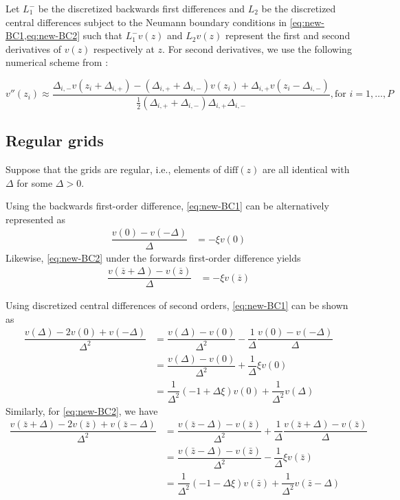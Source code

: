 \documentclass[11pt]{article}
\begin{document}
Let $L_1^{-}$ be the discretized backwards first differences and $L_2$ be the discretized central differences subject to the Neumann boundary conditions in \cref{eq:new-BC1,eq:new-BC2} such that $L_1^{-} v(z)$ and $L_2 v(z)$ represent the first and second derivatives of $v(z)$ respectively at $z$. For second derivatives, we use the following numerical scheme from \cite{achdou17}:

\begin{equation}
v''(z_i) \approx \dfrac{ \Delta_{i,-} v( z_i + \Delta_{i,+}) - (\Delta_{i,+} + \Delta_{i,-}) v( z_i ) + \Delta_{i,+} v( z_i - \Delta_{i,-})}{\frac{1}{2}(\Delta_{i,+} + \Delta_{i,-}) \Delta_{i,+} \Delta_{i,-} }, \text{for } i = 1, \ldots, P
\end{equation}





\subsection{Regular grids}
Suppose that the grids are regular, i.e., elements of $\text{diff}(z)$ are all identical with $\Delta$ for some $\Delta > 0$.

Using the backwards first-order difference, \eqref{eq:new-BC1} can be alternatively represented as
\begin{align}
\dfrac{v(0) - v(-\Delta)}{\Delta} &= - \xi v(0)
\end{align}
Likewise, \eqref{eq:new-BC2} under the forwards first-order difference yields
\begin{align}
\dfrac{v(\overline{z} + \Delta) - v(\overline{z})}{\Delta} &= - \xi v(\overline{z})
\end{align}

Using discretized central differences of second orders, \eqref{eq:new-BC1} can be shown as
\begin{align}
\dfrac{v (\Delta) - 2 v(0) + v(-\Delta)}{\Delta^2} &=   \dfrac{v(\Delta) - v(0)}{\Delta^2} - \dfrac{1}{\Delta}\dfrac{v (0) - v(-\Delta) }{\Delta}  \\
&= \dfrac{v(\Delta) - v(0)}{\Delta^2} + \dfrac{1}{\Delta} \xi v(0)  \\ 
&= \dfrac{1}{\Delta^2}  (- 1 + \Delta \xi) v(0)  + \dfrac{1}{\Delta^2}  v(\Delta)  
\end{align}
Similarly, for \eqref{eq:new-BC2}, we have
\begin{align}
\dfrac{v (\bar{z} + \Delta) - 2 v(\bar{z} ) + v(\bar{z} -\Delta)}{\Delta^2} &=   \dfrac{v(\bar{z} - \Delta) - v(\bar{z})}{\Delta^2} + \dfrac{1}{\Delta}\dfrac{ v(\bar{z}+\Delta) - v (\bar{z}) }{\Delta}  \\
&= \dfrac{v(\bar{z} - \Delta) - v(\bar{z})}{\Delta^2}  - \dfrac{1}{\Delta} \xi v(\bar{z})  \\ 
&= \dfrac{1}{\Delta^2}  (- 1 - \Delta \xi) v(\bar{z})  + \dfrac{1}{\Delta^2}  v(\bar{z} - \Delta)  
\end{align}
\end{document}
